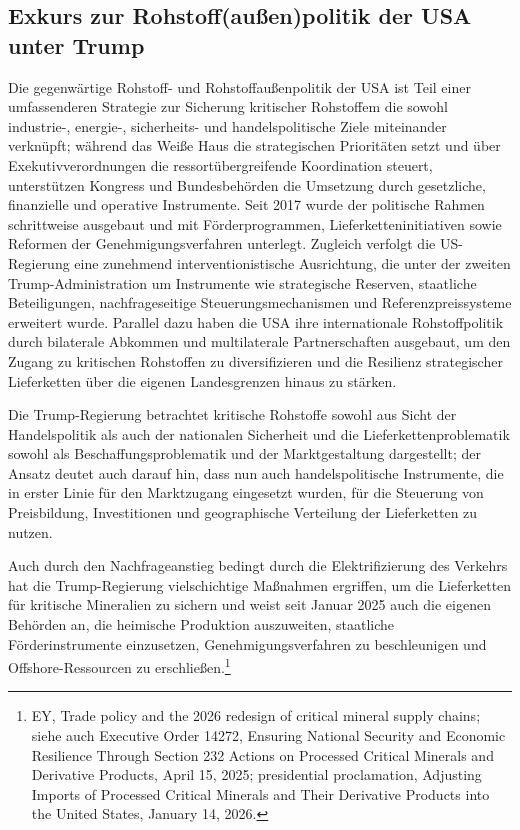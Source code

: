 \documentclass[12pt,a4paper,oneside]{book} %
\begin{document}
{\subsection{Exkurs zur Rohstoff(außen)politik der USA unter Trump}

Die gegenwärtige Rohstoff- und Rohstoffaußenpolitik der USA ist Teil einer umfassenderen Strategie zur Sicherung kritischer Rohstoffem die sowohl industrie-, energie-, sicherheits- und handelspolitische Ziele miteinander verknüpft; während das Weiße Haus die strategischen Prioritäten setzt und über Exekutivverordnungen die ressortübergreifende Koordination steuert, unterstützen Kongress und Bundesbehörden die Umsetzung durch gesetzliche, finanzielle und operative Instrumente. Seit 2017 wurde der politische Rahmen schrittweise ausgebaut und mit Förderprogrammen, Lieferketteninitiativen sowie Reformen der Genehmigungsverfahren unterlegt. Zugleich verfolgt die US-Regierung eine zunehmend interventionistische Ausrichtung, die unter der zweiten Trump-Administration um Instrumente wie strategische Reserven, staatliche Beteiligungen, nachfrageseitige Steuerungsmechanismen und Referenzpreissysteme erweitert wurde. Parallel dazu haben die USA ihre internationale Rohstoffpolitik durch bilaterale Abkommen und multilaterale Partnerschaften ausgebaut, um den Zugang zu kritischen Rohstoffen zu diversifizieren und die Resilienz strategischer Lieferketten über die eigenen Landesgrenzen hinaus zu stärken.\autocite{PE 786.415 S. 33}

Die Trump-Regierung betrachtet kritische Rohstoffe sowohl aus Sicht der Handelspolitik als auch der nationalen Sicherheit und die Lieferkettenproblematik sowohl als Beschaffungsproblematik und der Marktgestaltung dargestellt; der Ansatz deutet auch darauf hin, dass nun auch handelspolitische Instrumente, die in erster Linie für den Marktzugang eingesetzt wurden, für die Steuerung von Preisbildung, Investitionen und geographische Verteilung der Lieferketten zu nutzen.\autocite{EY, Trade policy and the 2026 redesign of critical mineral supply chains}

Auch durch den Nachfrageanstieg bedingt durch die Elektrifizierung des Verkehrs hat die Trump-Regierung vielschichtige Maßnahmen ergriffen, um die Lieferketten für kritische Mineralien zu sichern und weist seit Januar 2025 auch die eigenen Behörden an, die heimische Produktion auszuweiten, staatliche Förderinstrumente einzusetzen, Genehmigungsverfahren zu beschleunigen und Offshore-Ressourcen zu erschließen.\footnote{EY, Trade policy and the 2026 redesign of critical mineral supply chains; siehe auch Executive Order 14272, Ensuring National Security and Economic Resilience Through Section 232 Actions on Processed Critical Minerals and Derivative Products, April 15, 2025; presidential proclamation, Adjusting Imports of Processed Critical Minerals and Their Derivative Products into the United States, January 14, 2026.}

}
\end{document}

